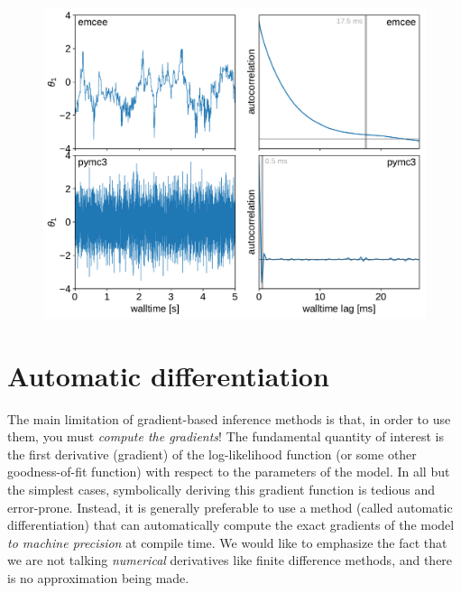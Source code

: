 \documentclass[modern]{aastex62}
\begin{document}


\begin{figure}[htbp]
\begin{centering}
\includegraphics[width=0.8\linewidth]{figures/gaussians.pdf}
\end{centering}
\end{figure}

\section{Automatic differentiation}

The main limitation of gradient-based inference methods is that, in order to
use them, you must \emph{compute the gradients}!
The fundamental quantity of interest is the first derivative (gradient) of the
log-likelihood function (or some other goodness-of-fit function) with respect
to the parameters of the model.
In all but the simplest cases, symbolically deriving this gradient function is
tedious and error-prone.
Instead, it is generally preferable to use a method (called automatic
differentiation) that can automatically compute the exact gradients of the
model \emph{to machine precision} at compile time.
We would like to emphasize the fact that we are not talking \emph{numerical}
derivatives like finite difference methods, and there is no approximation
being made.
\end{document}
